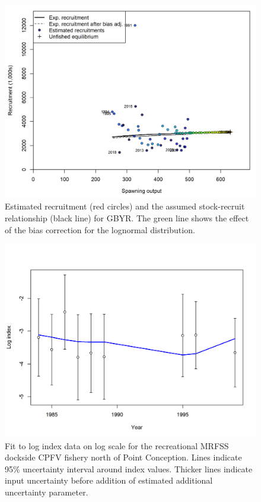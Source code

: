 \documentclass[12pt,]{article}
\begin{document}
\begin{figure}
\centering
\includegraphics{r4ss/plots_mod1/SR_curve2.png}
\caption{Estimated recruitment (red circles) and the assumed
stock-recruit relationship (black line) for GBYR. The green line shows
the effect of the bias correction for the lognormal distribution.
\label{fig:SR_curve2}}
\end{figure}

\FloatBarrier 

\begin{figure}
\centering
\includegraphics{r4ss/plots_mod1/index5_logcpuefit_RecDocksideNorth.png}
\caption{Fit to log index data on log scale for the recreational MRFSS
dockside CPFV fishery north of Point Conception. Lines indicate 95\%
uncertainty interval around index values. Thicker lines indicate input
uncertainty before addition of estimated additional uncertainty
parameter. \label{fig:index5_logcpuefit_RecDocksideNorth}}
\end{figure}
\end{document}
